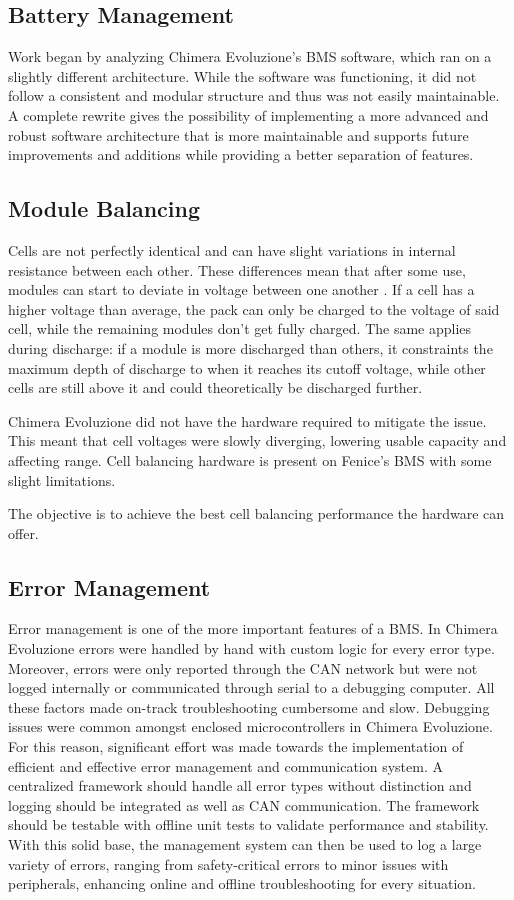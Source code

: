\subsection{Battery Management}

Work began by analyzing Chimera Evoluzione's BMS software, which ran on a slightly different architecture. While the software was functioning, it did not follow a consistent and modular structure and thus was not easily maintainable. A complete rewrite gives the possibility of implementing a more advanced and robust software architecture that is more maintainable and supports future improvements and additions while providing a better separation of features.

\subsection{Module Balancing}
Cells are not perfectly identical and can have slight variations in internal resistance between each other. These differences mean that after some use, modules can start to deviate in voltage between one another \cite{6966514}. If a cell has a higher voltage than average, the pack can only be charged to the voltage of said cell, while the remaining modules don't get fully charged. The same applies during discharge: if a module is more discharged than others, it constraints the maximum depth of discharge to when it reaches its cutoff voltage, while other cells are still above it and could theoretically be discharged further.

Chimera Evoluzione did not have the hardware required to mitigate the issue. This meant that cell voltages were slowly diverging, lowering usable capacity and affecting range. Cell balancing hardware is present on Fenice's BMS with some slight limitations.

The objective is to achieve the best cell balancing performance the hardware can offer.

\subsection{Error Management}
Error management is one of the more important features of a BMS. In Chimera Evoluzione errors were handled by hand with custom logic for every error type. Moreover, errors were only reported through the CAN network but were not logged internally or communicated through serial to a debugging computer. All these factors made on-track troubleshooting cumbersome and slow. Debugging issues were common amongst enclosed microcontrollers in Chimera Evoluzione. For this reason, significant effort was made towards the implementation of  efficient and effective error management and communication system. A centralized framework should handle all error types without distinction and logging should be integrated as well as CAN communication. The framework should be testable with offline unit tests to validate performance and stability. With this solid base, the management system can then be used to log a large variety of errors, ranging from safety-critical errors to minor issues with peripherals, enhancing online and offline troubleshooting for every situation.

\newpage

